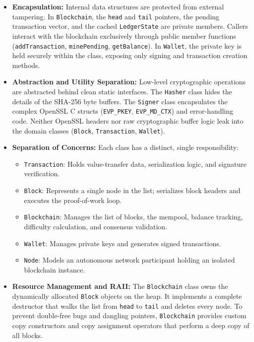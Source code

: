 \documentclass[11pt,a4paper]{report}
\begin{document}
\begin{itemize}
    \item \textbf{Encapsulation:}
    Internal data structures are protected from external tampering. In \texttt{Blockchain}, the \texttt{head} and \texttt{tail} pointers, the pending transaction vector, and the cached \texttt{LedgerState} are private members. Callers interact with the blockchain exclusively through public member functions (\texttt{addTransaction}, \texttt{minePending}, \texttt{getBalance}). In \texttt{Wallet}, the private key is held securely within the class, exposing only signing and transaction creation methods.

    \item \textbf{Abstraction and Utility Separation:}
    Low-level cryptographic operations are abstracted behind clean static interfaces. The \texttt{Hasher} class hides the details of the SHA-256 byte buffers. The \texttt{Signer} class encapsulates the complex OpenSSL C structs (\texttt{EVP\_PKEY}, \texttt{EVP\_MD\_CTX}) and error-handling code. Neither OpenSSL headers nor raw cryptographic buffer logic leak into the domain classes (\texttt{Block}, \texttt{Transaction}, \texttt{Wallet}).

    \item \textbf{Separation of Concerns:}
    Each class has a distinct, single responsibility:
    \begin{itemize}
        \item \texttt{Transaction}: Holds value-transfer data, serialization logic, and signature verification.
        \item \texttt{Block}: Represents a single node in the list; serializes block headers and executes the proof-of-work loop.
        \item \texttt{Blockchain}: Manages the list of blocks, the mempool, balance tracking, difficulty calculation, and consensus validation.
        \item \texttt{Wallet}: Manages private keys and generates signed transactions.
        \item \texttt{Node}: Models an autonomous network participant holding an isolated blockchain instance.
    \end{itemize}

    \item \textbf{Resource Management and RAII:}
    The \texttt{Blockchain} class owns the dynamically allocated \texttt{Block} objects on the heap. It implements a complete destructor that walks the list from \texttt{head} to \texttt{tail} and deletes every node. To prevent double-free bugs and dangling pointers, \texttt{Blockchain} provides custom copy constructors and copy assignment operators that perform a deep copy of all blocks.


\end{itemize}
\end{document}
